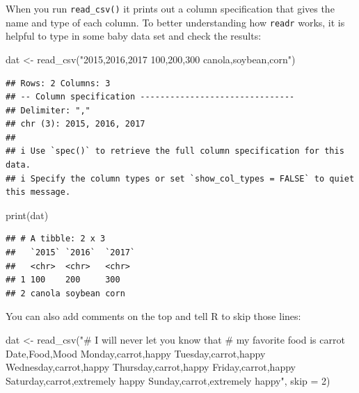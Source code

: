 \documentclass[
  12pt,
]{krantz}
\makeatletter
\newenvironment{Shaded}{\begin{snugshade}}{\end{snugshade}}
\newcommand{\AttributeTok}[1]{\textcolor[rgb]{0.61,0.61,0.61}{#1}}
\newcommand{\DecValTok}[1]{\textcolor[rgb]{0.06,0.06,0.06}{#1}}
\newcommand{\FunctionTok}[1]{\textcolor[rgb]{0,0,0}{#1}}
\newcommand{\NormalTok}[1]{#1}
\newcommand{\OtherTok}[1]{\textcolor[rgb]{0.37,0.37,0.37}{#1}}
\newcommand{\StringTok}[1]{\textcolor[rgb]{0.5,0.5,0.5}{#1}}
\newenvironment{kframe}{%
\medskip{}
\setlength{\fboxsep}{.8em}
 \def\at@end@of@kframe{}%
 \ifinner\ifhmode%
  \def\at@end@of@kframe{\end{minipage}}%
  \begin{minipage}{\columnwidth}%
 \fi\fi%
 \def\FrameCommand##1{\hskip\@totalleftmargin \hskip-\fboxsep
 \colorbox{shadecolor}{##1}\hskip-\fboxsep
     \hskip-\linewidth \hskip-\@totalleftmargin \hskip\columnwidth}%
 \MakeFramed {\advance\hsize-\width
   \@totalleftmargin\z@ \linewidth\hsize
   \@setminipage}}%
 {\par\unskip\endMakeFramed%
 \at@end@of@kframe}
\renewenvironment{Shaded}{\begin{kframe}}{\end{kframe}}
\makeatother
\begin{document}
When you run \texttt{read\_csv()} it prints out a column specification that gives the name and type of each column. To better understanding how \texttt{readr} works, it is helpful to type in some baby data set and check the results:

\begin{Shaded}
\begin{Highlighting}[]
\NormalTok{dat }\OtherTok{\textless{}{-}} \FunctionTok{read\_csv}\NormalTok{(}\StringTok{"2015,2016,2017}
\StringTok{100,200,300}
\StringTok{canola,soybean,corn"}\NormalTok{)}
\end{Highlighting}
\end{Shaded}

\begin{verbatim}
## Rows: 2 Columns: 3
## -- Column specification -------------------------------
## Delimiter: ","
## chr (3): 2015, 2016, 2017
## 
## i Use `spec()` to retrieve the full column specification for this data.
## i Specify the column types or set `show_col_types = FALSE` to quiet this message.
\end{verbatim}

\begin{Shaded}
\begin{Highlighting}[]
\FunctionTok{print}\NormalTok{(dat)}
\end{Highlighting}
\end{Shaded}

\begin{verbatim}
## # A tibble: 2 x 3
##   `2015` `2016`  `2017`
##   <chr>  <chr>   <chr> 
## 1 100    200     300   
## 2 canola soybean corn
\end{verbatim}

You can also add comments on the top and tell R to skip those lines:

\begin{Shaded}
\begin{Highlighting}[]
\NormalTok{dat }\OtherTok{\textless{}{-}} \FunctionTok{read\_csv}\NormalTok{(}\StringTok{"\# I will never let you know that}
\StringTok{          \# my favorite food is carrot}
\StringTok{          Date,Food,Mood}
\StringTok{          Monday,carrot,happy}
\StringTok{          Tuesday,carrot,happy}
\StringTok{          Wednesday,carrot,happy}
\StringTok{          Thursday,carrot,happy}
\StringTok{          Friday,carrot,happy}
\StringTok{          Saturday,carrot,extremely happy}
\StringTok{          Sunday,carrot,extremely happy"}\NormalTok{, }
          \AttributeTok{skip =} \DecValTok{2}\NormalTok{)}
\end{Highlighting}
\end{Shaded}
\end{document}
